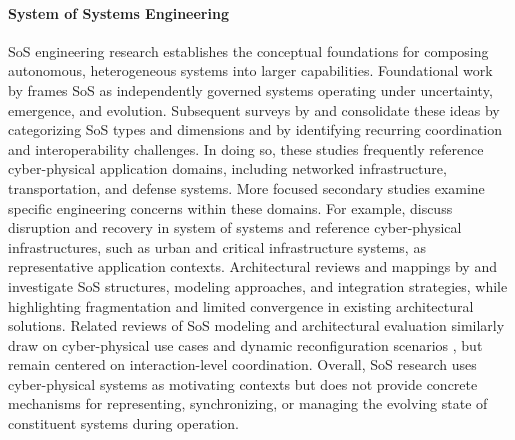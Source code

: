 \paragraph{System of Systems Engineering}
SoS engineering research establishes the conceptual foundations for composing autonomous, heterogeneous systems into larger capabilities. Foundational work by \citet{keating2003system} frames SoS as independently governed systems operating under uncertainty, emergence, and evolution. Subsequent surveys by \citet{gorod2008system} and \citet{nielsen2015systems} consolidate these ideas by categorizing SoS types and dimensions and by identifying recurring coordination and interoperability challenges. In doing so, these studies frequently reference cyber-physical application domains, including networked infrastructure, transportation, and defense systems.
More focused secondary studies examine specific engineering concerns within these domains. For example, \citet{uday2015designing} discuss disruption and recovery in system of systems and reference cyber-physical infrastructures, such as urban and critical infrastructure systems, as representative application contexts. Architectural reviews and mappings by \citet{klein2013systematic} and \citet{axelsson2015systematic} investigate SoS structures, modeling approaches, and integration strategies, while highlighting fragmentation and limited convergence in existing architectural solutions. Related reviews of SoS modeling and architectural evaluation similarly draw on cyber-physical use cases and dynamic reconfiguration scenarios \citep{dridi2020system, santos2022evaluation, vargas2016approaches}, but remain centered on interaction-level coordination.
Overall, SoS research uses cyber-physical systems as motivating contexts but does not provide concrete mechanisms for representing, synchronizing, or managing the evolving state of constituent systems during operation.


